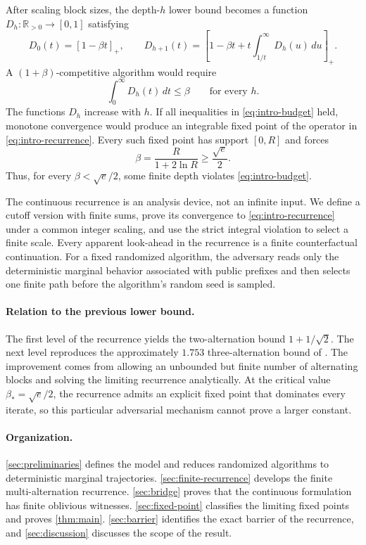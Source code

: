 \documentclass[11pt,letterpaper]{article}
\newcommand{\cref}[1]{\autoref{#1}}
\newcommand{\Cref}[1]{\autoref{#1}}
\theoremstyle{definition}
\theoremstyle{remark}
\newcommand{\Rplus}{\mathbb{R}_{>0}}
\newcommand{\pos}[1]{\left[#1\right]_{+}}
\begin{document}
After scaling block sizes, the depth-$h$ lower bound becomes a function $D_h:\Rplus\to[0,1]$ satisfying
\begin{equation}\label{eq:intro-recurrence} D_0(t)=\pos{1-\beta t},\qquad D_{h+1}(t)=\pos{1-\beta t+t\int_{1/t}^{\infty}D_h(u)\,du}. \end{equation}
A $(1+\beta)$-competitive algorithm would require
\begin{equation}\label{eq:intro-budget} \int_0^{\infty}D_h(t)\,dt\le\beta \qquad\text{for every }h. \end{equation}
The functions $D_h$ increase with $h$.
If all inequalities in \cref{eq:intro-budget} held, monotone convergence would produce an integrable fixed point of the operator in \cref{eq:intro-recurrence}.
Every such fixed point has support $[0,R]$ and forces
\begin{equation}\label{eq:intro-threshold} \beta=\frac{R}{1+2\ln R}\ge\frac{\sqrt e}{2}. \end{equation}
Thus, for every $\beta<\sqrt e/2$, some finite depth violates \cref{eq:intro-budget}.

The continuous recurrence is an analysis device, not an infinite input.
We define a cutoff version with finite sums, prove its convergence to \cref{eq:intro-recurrence} under a common integer scaling, and use the strict integral violation to select a finite scale.
Every apparent look-ahead in the recurrence is a finite counterfactual continuation.
For a fixed randomized algorithm, the adversary reads only the deterministic marginal behavior associated with public prefixes and then selects one finite path before the algorithm's random seed is sampled.

\paragraph{Relation to the previous lower bound.}
The first level of the recurrence yields the two-alternation bound $1+1/\sqrt2$.
The next level reproduces the approximately $1.753$ three-alternation bound of \citet{WangWong2015}.
The improvement comes from allowing an unbounded but finite number of alternating blocks and solving the limiting recurrence analytically.
At the critical value $\beta_*=\sqrt e/2$, the recurrence admits an explicit fixed point that dominates every iterate, so this particular adversarial mechanism cannot prove a larger constant.

\paragraph{Organization.}
\Cref{sec:preliminaries} defines the model and reduces randomized algorithms to deterministic marginal trajectories.
\Cref{sec:finite-recurrence} develops the finite multi-alternation recurrence.
\Cref{sec:bridge} proves that the continuous formulation has finite oblivious witnesses.
\Cref{sec:fixed-point} classifies the limiting fixed points and proves \cref{thm:main}.
\Cref{sec:barrier} identifies the exact barrier of the recurrence, and \cref{sec:discussion} discusses the scope of the result.
\end{document}
